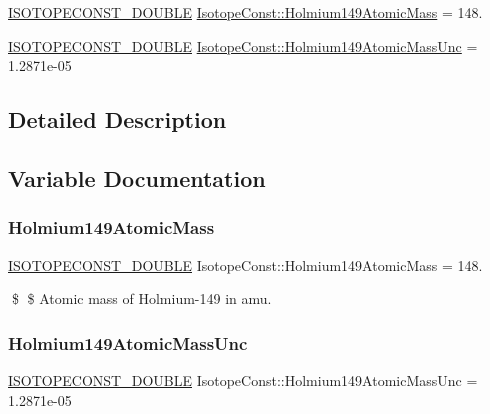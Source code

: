\begin{DoxyCompactItemize}
\item 
\mbox{\hyperlink{group___isotope_const-_macros_ga8f45a7272ce02c0b4c65c44636ed719a}{I\+S\+O\+T\+O\+P\+E\+C\+O\+N\+S\+T\+\_\+\+D\+O\+U\+B\+LE}} \mbox{\hyperlink{group___isotope_const-_holmium-_ho149_gac0a93f4ed70bfecee455cff5146052fb}{Isotope\+Const\+::\+Holmium149\+Atomic\+Mass}} = 148.
\item 
\mbox{\hyperlink{group___isotope_const-_macros_ga8f45a7272ce02c0b4c65c44636ed719a}{I\+S\+O\+T\+O\+P\+E\+C\+O\+N\+S\+T\+\_\+\+D\+O\+U\+B\+LE}} \mbox{\hyperlink{group___isotope_const-_holmium-_ho149_gab162d8b83cfb3496cb4dc271aa08792e}{Isotope\+Const\+::\+Holmium149\+Atomic\+Mass\+Unc}} = 1.\+2871e-\/05
\end{DoxyCompactItemize}


\subsection{Detailed Description}


\subsection{Variable Documentation}
\mbox{\label{group___isotope_const-_holmium-_ho149_gac0a93f4ed70bfecee455cff5146052fb}} 
\subsubsection{\texorpdfstring{Holmium149\+Atomic\+Mass}{Holmium149AtomicMass}}
{\footnotesize\ttfamily \mbox{\hyperlink{group___isotope_const-_macros_ga8f45a7272ce02c0b4c65c44636ed719a}{I\+S\+O\+T\+O\+P\+E\+C\+O\+N\+S\+T\+\_\+\+D\+O\+U\+B\+LE}} Isotope\+Const\+::\+Holmium149\+Atomic\+Mass = 148.}

\$ \$ Atomic mass of Holmium-\/149 in amu. \mbox{\label{group___isotope_const-_holmium-_ho149_gab162d8b83cfb3496cb4dc271aa08792e}} 
\subsubsection{\texorpdfstring{Holmium149\+Atomic\+Mass\+Unc}{Holmium149AtomicMassUnc}}
{\footnotesize\ttfamily \mbox{\hyperlink{group___isotope_const-_macros_ga8f45a7272ce02c0b4c65c44636ed719a}{I\+S\+O\+T\+O\+P\+E\+C\+O\+N\+S\+T\+\_\+\+D\+O\+U\+B\+LE}} Isotope\+Const\+::\+Holmium149\+Atomic\+Mass\+Unc = 1.\+2871e-\/05}

